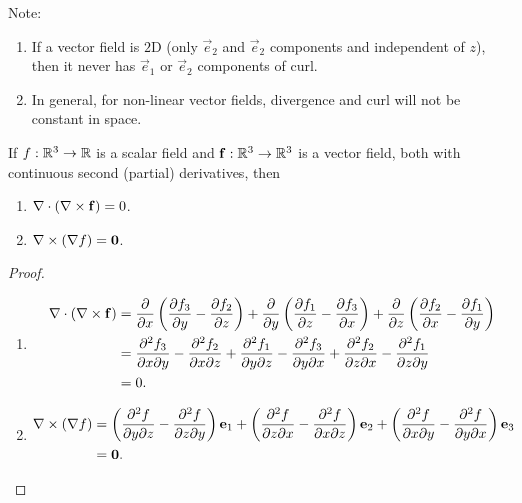 \documentclass[10pt, a4paper]{article}
\begin{document}
Note:
\begin{enumerate}[label = (\roman*)]
    \item If a vector field is $2$D
    (only $\vec{e}_2$ and $\vec{e}_2$ components and independent of $z$),
    then it never has $\vec{e}_1$ or $\vec{e}_2$ components of curl.

    \item In general,
    for non-linear vector fields,
    divergence and curl will not be constant in space.
\end{enumerate}

\begin{corollary}
    If $f : \R ^ 3 \to \R$ is a scalar field and $\vec{f} : \R ^ 3 \to \R ^ 3$ is a vector field,
    both with continuous second
    (partial)
    derivatives,
    then
    \begin{enumerate}[label = (\roman*)]
        \item $\bnabla \cdot (\bnabla \times \vec{f}) = 0$.

        \item $\bnabla \times (\bnabla f) = \vec{0}$.
    \end{enumerate}

    \begin{proof}
        \begin{enumerate}[label = (\roman*)]
            \item
            \begin{align*}
                \bnabla \cdot (\bnabla \times \vec{f}) &= \pd{x}\left(\pd[f_3]{y} - \pd[f_2]{z}\right) + \pd{y}\left(\pd[f_1]{z} - \pd[f_3]{x}\right) + \pd{z}\left(\pd[f_2]{x} - \pd[f_1]{y}\right) \\
                &= \frac{\partial ^ 2f_3}{\partial x\partial y} - \frac{\partial ^ 2f_2}{\partial x\partial z} + \frac{\partial ^ 2f_1}{\partial y\partial z} - \frac{\partial ^ 2f_3}{\partial y\partial x} + \frac{\partial ^ 2f_2}{\partial z\partial x} - \frac{\partial ^ 2f_1}{\partial z\partial y} \\
                &= 0.
            \end{align*}

            \item
            \begin{align*}
                \bnabla \times (\bnabla f) &= \left(\frac{\partial ^ 2f}{\partial y\partial z} - \frac{\partial ^ 2f}{\partial z\partial y}\right)\vec{e}_1 + \left(\frac{\partial ^ 2f}{\partial z\partial x} - \frac{\partial ^ 2f}{\partial x\partial z}\right)\vec{e}_2 + \left(\frac{\partial ^ 2f}{\partial x\partial y} - \frac{\partial ^ 2f}{\partial y\partial x}\right)\vec{e}_3 \\
                &= \vec{0}.
            \end{align*}
        \end{enumerate}
    \end{proof}
\end{corollary}
\end{document}
